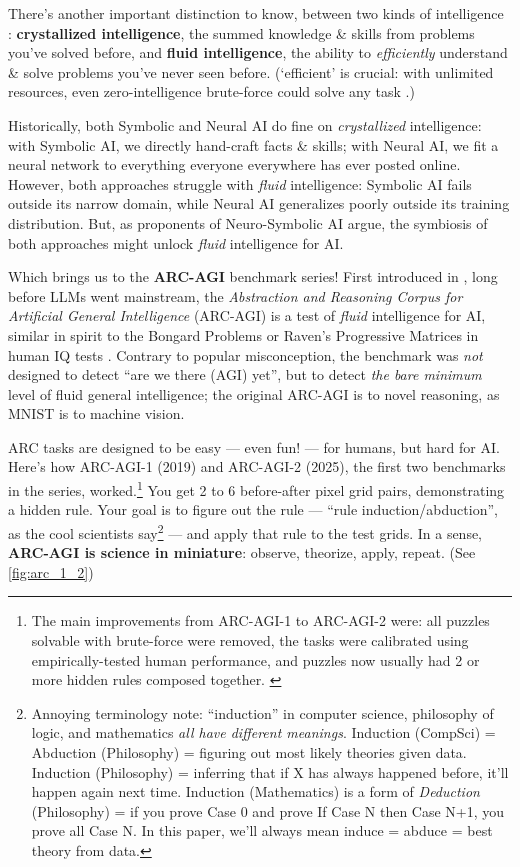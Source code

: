 \documentclass[11pt]{article}
\begin{document}
There's another important distinction to know, between two kinds of intelligence \citep{cattell}: \textbf{crystallized intelligence}, the summed knowledge \& skills from problems you've solved before, and \textbf{fluid intelligence}, the ability to \textit{efficiently} understand \& solve problems you've never seen before. (`efficient' is crucial: with unlimited resources, even zero-intelligence brute-force could solve any task \citep{chollet_intelligence_efficiency}.)

Historically, both Symbolic and Neural AI do fine on \textit{crystallized} intelligence: with Symbolic AI, we directly hand-craft facts \& skills; with Neural AI, we fit a neural network to everything everyone everywhere has ever posted online. However, both approaches struggle with \textit{fluid} intelligence: Symbolic AI fails outside its narrow domain, while Neural AI generalizes poorly outside its training distribution. But, as proponents of Neuro-Symbolic AI argue, the symbiosis of both approaches might unlock \textit{fluid} intelligence for AI.

Which brings us to the \textbf{ARC-AGI} benchmark series! First introduced in \citet{chollet_intelligence_efficiency}, long before LLMs went mainstream, the \textit{Abstraction and Reasoning Corpus for Artificial General Intelligence} (ARC-AGI) is a test of \textit{fluid} intelligence for AI, similar in spirit to the Bongard Problems \citep{bongard_problems} or Raven's Progressive Matrices in human IQ tests \citep{raven_matrices}. Contrary to popular misconception, the benchmark was \textit{not} designed to detect ``are we there (AGI) yet'', but to detect \textit{the bare minimum} level of fluid general intelligence; the original ARC-AGI is to novel reasoning, as MNIST is to machine vision.

ARC tasks are designed to be easy — even fun! — for humans, but hard for AI. Here's how ARC-AGI-1 (2019) and ARC-AGI-2 (2025), the first two benchmarks in the series, worked.\footnote{The main improvements from ARC-AGI-1 to ARC-AGI-2 were: all puzzles solvable with brute-force were removed, the tasks were calibrated using empirically-tested human performance, and puzzles now usually had 2 or more hidden rules composed together. \citep{arc_agi_2}} You get 2 to 6 before-after pixel grid pairs, demonstrating a hidden rule. Your goal is to figure out the rule — ``rule induction/abduction'', as the cool scientists say\footnote{Annoying terminology note: ``induction'' in computer science, philosophy of logic, and mathematics \textit{all have different meanings}. Induction (CompSci) = Abduction (Philosophy) = figuring out most likely theories given data. Induction (Philosophy) = inferring that if X has always happened before, it'll happen again next time. Induction (Mathematics) is a form of \textit{Deduction} (Philosophy) = if you prove Case 0 and prove If Case N then Case N+1, you prove all Case N. In this paper, we'll always mean induce = abduce = best theory from data.} — and apply that rule to the test grids. In a sense, \textbf{ARC-AGI is science in miniature}: observe, theorize, apply, repeat. (See \autoref{fig:arc_1_2})
\end{document}

